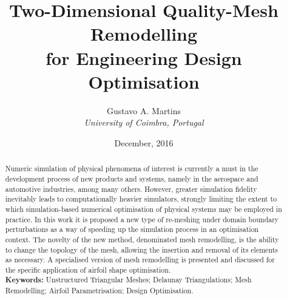 \documentclass[10pt, twoside]{article}
\title{\textbf{\huge Two-Dimensional Quality-Mesh Remodelling\\for Engineering Design Optimisation}}
\author{Gustavo A. Martins\\\normalsize \textit{University of Coimbra, Portugal}}
\date{December, 2016}
\begin{document}
	
\maketitle

\begin{abstract}
Numeric simulation of physical phenomena of interest is currently a must in the development process of new products and systems, namely in the aerospace and automotive industries, among many others. However, greater simulation fidelity inevitably leads to computationally heavier simulators, strongly limiting the extent to which simulation-based numerical optimisation of physical systems may be employed in practice. In this work it is proposed a new type of re-meshing under domain boundary perturbations as a way of speeding up the simulation process in an optimisation context. The novelty of the new method, denominated mesh remodelling, is the ability to change the topology of the mesh, allowing the insertion and removal of its elements as necessary. A specialised version of mesh remodelling is presented and discussed for the specific application of airfoil shape optimisation.\\

\noindent\textbf{Keywords:} Unstructured Triangular Meshes; Delaunay Triangulations; Mesh Remodelling; Airfoil Parametrisation; Design Optimisation.
\end{abstract}







\nocite{*}


	
\end{document}
